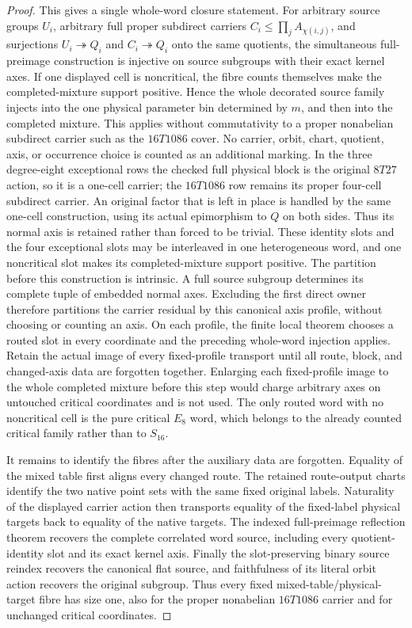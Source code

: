 \begin{proof}
This gives a single whole-word closure statement.  For arbitrary source
groups $U_i$, arbitrary full proper subdirect carriers
$C_i\leq\prod_j A_{\chi(i,j)}$, and surjections
$U_i\twoheadrightarrow Q_i$ and $C_i\twoheadrightarrow Q_i$ onto the same quotients,
the simultaneous full-preimage construction is injective on source
subgroups with their exact kernel axes.  If one displayed cell is
noncritical, the fibre counts themselves make the completed-mixture
support positive.  Hence the whole decorated source family injects into
the one physical parameter bin determined by $m$, and then into the
completed mixture.  This applies without commutativity to a proper
nonabelian subdirect carrier such as the $16T1086$ cover.  No carrier,
orbit, chart, quotient, axis, or occurrence choice is counted as an
additional marking.  In the three degree-eight exceptional rows the checked
full physical block is the original $8T27$ action, so it is a one-cell
carrier; the $16T1086$ row remains its proper four-cell subdirect carrier.
An original factor that is left in place is handled by the same one-cell
construction, using its actual epimorphism to $Q$ on both sides.  Thus its
normal axis is retained rather than forced to be trivial.  These identity
slots and the four exceptional slots may be interleaved in one heterogeneous
word, and one noncritical slot makes its completed-mixture support positive.
The partition before this construction is intrinsic.  A full source
subgroup determines its complete tuple of embedded normal axes.  Excluding
the first direct owner therefore partitions the carrier residual by this
canonical axis profile, without choosing or counting an axis.  On each
profile, the finite local theorem chooses a routed slot in every coordinate
and the preceding whole-word injection applies.  Retain the actual image of
every fixed-profile transport until all route, block, and changed-axis data
are forgotten together.  Enlarging each fixed-profile image to the whole
completed mixture before this step would charge arbitrary axes on untouched
critical coordinates and is not used.  The only routed word with no
noncritical cell is the pure critical $E_8$ word, which belongs to the already
counted critical family rather than to $S_{16}$.

It remains to identify the fibres after the auxiliary data are forgotten.
Equality of the mixed table first aligns every changed route.  The retained
route-output charts identify the two native point sets with the same fixed
original labels.  Naturality of the displayed carrier action then transports
equality of the fixed-label physical targets back to equality of the native
targets.  The indexed full-preimage reflection theorem recovers the complete
correlated word source, including every quotient-identity slot and its exact
kernel axis.  Finally the slot-preserving binary source reindex recovers the
canonical flat source, and faithfulness of its literal orbit action recovers
the original subgroup.  Thus every fixed mixed-table/physical-target fibre
has size one, also for the proper nonabelian $16T1086$ carrier and for
unchanged critical coordinates.


\end{proof}

